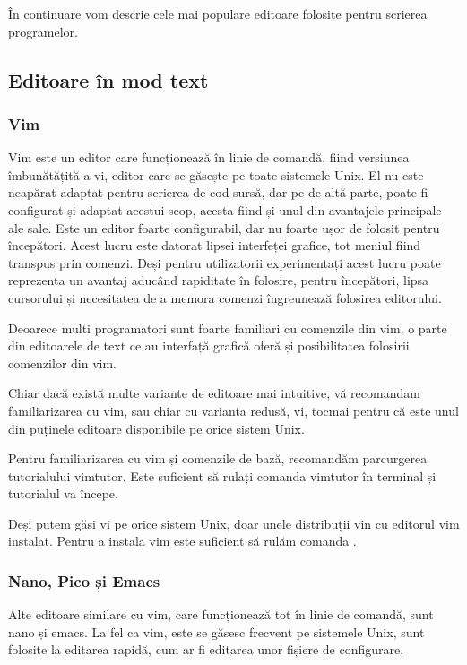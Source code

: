 În continuare vom descrie cele mai populare editoare folosite pentru scrierea
programelor.

\subsection{Editoare în mod text}
\label{sec:appdev-textedit}

\subsubsection{Vim}
\label{sec:appdev-textedit-vim}

Vim este un editor care funcționează în linie de comandă, fiind versiunea
îmbunătățită a vi, editor care se găsește pe toate sistemele Unix. El nu este
neapărat adaptat pentru scrierea de cod sursă, dar pe de altă parte, poate fi
configurat și adaptat acestui scop, acesta fiind și unul din avantajele
principale ale sale. Este un editor foarte configurabil, dar nu foarte ușor de
folosit pentru începători. Acest lucru este datorat lipsei interfeței grafice,
tot meniul fiind transpus prin comenzi. Deși pentru utilizatorii experimentați
acest lucru poate reprezenta un avantaj aducând rapiditate în folosire, pentru
începători, lipsa cursorului și necesitatea de a memora comenzi îngreunează
folosirea editorului.

Deoarece multi programatori sunt foarte familiari cu comenzile din vim, o parte
din editoarele de text ce au interfață grafică oferă și posibilitatea folosirii
comenzilor din vim.

Chiar dacă există multe variante de editoare mai intuitive, vă recomandam
familiarizarea cu vim, sau chiar cu varianta redusă, vi, tocmai pentru că este
unul din puținele editoare disponibile pe orice sistem Unix.

Pentru familiarizarea cu vim și comenzile de bază, recomandăm parcurgerea
tutorialului vimtutor. Este suficient să rulați comanda vimtutor în terminal și
tutorialul va începe.

Deși putem găsi vi pe orice sistem Unix, doar unele distribuții vin cu editorul
vim instalat. Pentru a instala vim este suficient să rulăm comanda .

\subsubsection{Nano, Pico și Emacs}
\label{sec:appdev-textedit-nano-pico-emacs}

Alte editoare similare cu vim, care funcționează tot în linie de comandă, sunt
nano și emacs. La fel ca vim, este se găsesc frecvent pe sistemele Unix, sunt
folosite la editarea rapidă, cum ar fi editarea unor fișiere de configurare.


